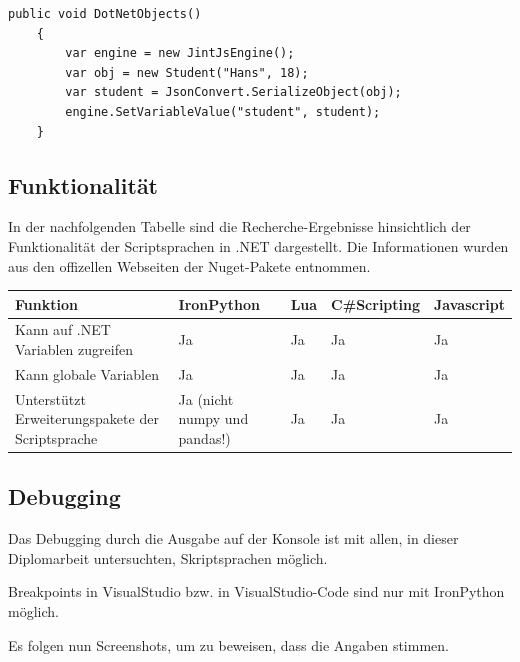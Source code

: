 \begin{lstlisting}[language={[Sharp]C}, caption=JavascriptObjects, label=lst:imp:jsObj]
    public void DotNetObjects()
    {
        var engine = new JintJsEngine();
        var obj = new Student("Hans", 18);
        var student = JsonConvert.SerializeObject(obj);
        engine.SetVariableValue("student", student);           
    }
\end{lstlisting}

\newpage
\subsection{Funktionalität}
In der nachfolgenden Tabelle sind die Recherche-Ergebnisse hinsichtlich der Funktionalität der Scriptsprachen in .NET dargestellt.
Die Informationen wurden aus den offizellen Webseiten der Nuget-Pakete entnommen.

\begin{table}[H]
    \begin{tabular}{|p{3cm}|p{3cm}|p{3cm}|p{3cm}|p{3cm}|}
        \hline
        Funktion & IronPython & Lua & C\#Scripting & Javascript\\ \hline
        Kann auf .NET Variablen zugreifen & Ja & Ja & Ja & Ja \\ \hline
        Kann globale Variablen & Ja & Ja & Ja & Ja \\ \hline
        Unterstützt Erweiterungspakete der Scriptsprache & Ja (nicht numpy und pandas!) & Ja & Ja & Ja \\ \hline 
    \end{tabular} 
\end{table}

\newpage
\subsection{Debugging}
Das Debugging durch die Ausgabe auf der Konsole ist mit allen, in dieser Diplomarbeit untersuchten, Skriptsprachen möglich.

Breakpoints in VisualStudio bzw. in VisualStudio-Code sind nur mit IronPython möglich.


Es folgen nun Screenshots, um zu beweisen, dass die Angaben stimmen.

